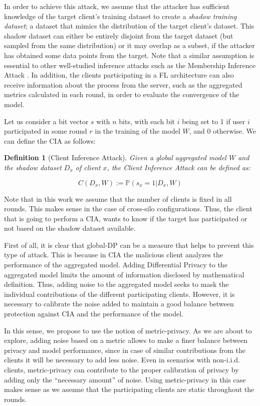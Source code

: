 \documentclass[5p,times]{elsarticle}
\newtheorem{definition}{Definition}
\begin{document}
In order to achieve this attack, we assume that the attacker has sufficient knowledge of the target client’s training dataset to create a \emph{shadow training dataset}; a dataset that mimics the distribution of the target client’s dataset. This shadow dataset can either be entirely disjoint from the target dataset (but sampled from the same distribution) or it may overlap as a subset, if the attacker has obtained some data points from the target.
Note that a similar assumption is essential to other well-studied inference attacks such as the Membership Inference Attack \cite{mia_attack}. In addition, the clients participating in a FL architecture can also receive information about the process from the server, such as the aggregated metrics calculated in each round, in order to evaluate the convergence of the model. 


Let us consider a bit vector $s$ with $n$ bits, with each bit $i$ being set to 1 if user $i$ participated in some round $r$ in the training of the model $W$, and 0 otherwise. We can define the CIA as follows:

\begin{definition}[Client Inference Attack] Given a global aggregated model $W$ and the shadow dataset $D_x$ of client $x$, the Client Inference Attack can be defined as:

$$
C(D_{x},W):= \mathbb{P}(s_{x} =1 | D_{x}, W)
$$
\end{definition}

Note that in this work we assume that the number of clients is fixed in all rounds. This makes sense in the case of cross-silo configurations. Thus, the client that is going to perform a CIA, wants to know if the target has participated or not based on the shadow dataset available.

First of all, it is clear that global-DP can be a measure that helps to prevent this type of attack. This is because in CIA the malicious client analyzes the performance of the aggregated model. Adding Differential Privacy to the aggregated model limits the amount of information disclosed by mathematical definition. Thus, adding noise to the aggregated model seeks to mask the individual contributions of the different participating clients. However, it is necessary to calibrate the noise added to maintain a good balance between protection against CIA and the performance of the model. 

In this sense, we propose to use the notion of metric-privacy. As we are about to explore, adding noise based on a metric allows to make a finer balance between privacy and model performance, since in case of similar contributions from the clients it will be necessary to add less noise. Even in scenarios with non-i.i.d. clients, metric-privacy can contribute to the proper calibration of privacy by adding only the ``necessary amount'' of noise. Using metric-privacy in this case makes sense as we assume that the participating clients are static throughout the rounds.
\end{document}
